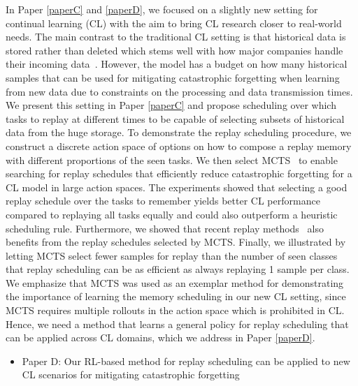 In Paper \ref{paperC} and \ref{paperD}, we focused on a slightly new setting for continual learning (CL) with the aim to bring CL research closer to real-world needs. The main contrast to the traditional CL setting is that historical data is stored rather than deleted which stems well with how major companies handle their incoming data~\cite{bronson2015open, asta2016observability}. However, the model has a budget on how many historical samples that can be used for mitigating catastrophic forgetting when learning from new data due to constraints on the processing and data transmission times. We present this setting in Paper \ref{paperC} and propose scheduling over which tasks to replay at different times to be capable of selecting subsets of historical data from the huge storage. To demonstrate the replay scheduling procedure, we construct a discrete action space of options on how to compose a replay memory with different proportions of the seen tasks. We then select MCTS~\cite{coulom2006efficient, browne2012survey} to enable searching for replay schedules that efficiently reduce catastrophic forgetting for a CL model in large action spaces. The experiments showed that selecting a good replay schedule over the tasks to remember yields better CL performance compared to replaying all tasks equally and could also outperform a heuristic scheduling rule. Furthermore, we showed that recent replay methods~\cite{chaudhry2021using, riemer2018learning, buzzega2020dark} also benefits from the replay schedules selected by MCTS. Finally, we illustrated by letting MCTS select fewer samples for replay than the number of seen classes that replay scheduling can be as efficient as always replaying 1 sample per class. We emphasize that MCTS was used as an exemplar method for demonstrating the importance of learning the memory scheduling in our new CL setting, since MCTS requires multiple rollouts in the action space which is prohibited in CL. Hence, we need a method that learns a general policy for replay scheduling that can be applied across CL domains, which we address in Paper \ref{paperD}.







\begin{itemize}
	\item Paper D: Our RL-based method for replay scheduling can be applied to new CL scenarios for mitigating catastrophic forgetting
\end{itemize}



